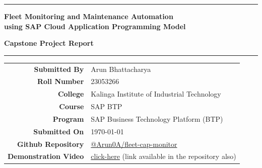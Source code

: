 \documentclass[a4paper,12pt]{article}
\begin{document}
\justifying
{}

\thispagestyle{empty}

\begin{center}
  \vspace*{10mm}

  {\color{sapblue}\rule{\linewidth}{2pt}}
  \vspace{6mm}

  {\fontsize{19}{28}\bfseries\color{sapblue}
    Fleet Monitoring and Maintenance Automation\\[4pt]
    using SAP Cloud Application Programming Model}
  \vspace{4mm}

  {\fontsize{15}{20}\bfseries\color{darkgray} Capstone Project Report}
  \vspace{2mm}

  {\color{sapblue}\rule{\linewidth}{2pt}}
  \vspace{12mm}

  \begin{tabular}{rl}
    \textbf{Submitted By} & Arun Bhattacharya \\[4pt]
    \textbf{Roll Number}  & 23053266 \\[4pt]
    \textbf{College}      & Kalinga Institute of Industrial Technology \\[4pt]
    \textbf{Course}       & SAP BTP \\[4pt]
    \textbf{Program}      & SAP Business Technology Platform (BTP) \\[4pt]
    \textbf{Submitted On} & \today \\
    \textbf{Github Repository} &  \hyperlink{https://github.com/Arun0A/fleet-cap-monitor}{@Arun0A/fleet-cap-monitor}\\
    \textbf{Demonstration Video} &  \hyperlink{https://drive.google.com/drive/folders/1TasOnKf6-VUxPJmYSOrbMaqZwU5ZBUav?usp=sharing}{click-here} (link available in the repository also)\\
  \end{tabular}

  \vspace{16mm}

\end{center}
\end{document}
